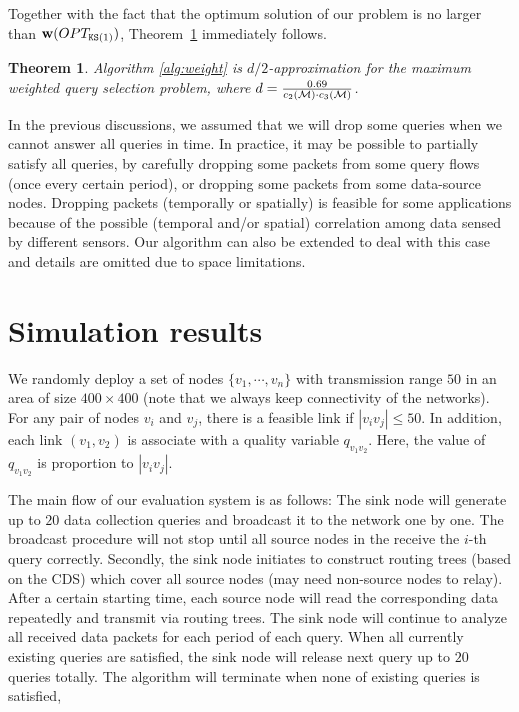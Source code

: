 \documentclass[conference,10pt]{IEEEtran}\usepackage{amsmath}
\newtheorem{boldtheorem}{\textbf{Theorem}}
\def\weight{\textbf{w}}
\begin{document}
Together with the fact that the optimum solution of our problem is
no larger than $\weight(OPT_{\knap(1)})$,
Theorem~\ref{the:weighted_appr} immediately follows.
\begin{boldtheorem}\label{the:weighted_appr}
Algorithm \ref{alg:weight} is $d/2$-approximation for the maximum
weighted query selection problem, where
 $d=\frac{0.69}{c_2({\cal M})\cdot c_3({\cal M})}$.
\end{boldtheorem}

In the previous discussions, we assumed that we will drop some
queries when we cannot answer all queries in time. In practice, it
may be
 possible to partially satisfy all queries, by carefully
 dropping some packets from some query flows (once every certain period), or
 dropping some packets from some data-source nodes.
  Dropping packets (temporally or spatially)
 is feasible for some applications because of the possible
 (temporal and/or spatial) correlation among data sensed by different
 sensors.
Our algorithm can also be extended to deal with this case and
details
 are omitted due to space limitations.



\section{Simulation results}
\label{sec:simulation}


We randomly deploy a set of nodes $\{v_1,\cdots, v_n \}$ with
transmission range $50$
 in an area of size $400 \times 400$ (note that we always keep
 connectivity of the networks).
For any pair of nodes $v_i$ and $v_j$, there is a feasible link
 if $|v_iv_j|\le 50$.
In addition, each link $(v_1,v_2)$ is associate with a quality
variable $q_{v_1v_2}$. Here, the value of $q_{v_1v_2}$
 is proportion to $|v_iv_j|$.

The main flow of our evaluation system is as follows: The sink node
will generate up to $20$ data collection
 queries and broadcast it to the network one by one.
The broadcast procedure will not stop until all source nodes in the
 receive  the $i$-th query correctly.
Secondly, the sink node initiates
 to construct
 routing trees (based on the CDS) which cover all source nodes (may need non-source nodes
   to relay).
After a certain starting time, each source node will read the corresponding data
  repeatedly and transmit via routing trees.
The sink node will continue to analyze all received data packets
 for each period of each query.
When all currently existing queries are satisfied, the sink node
 will release next query up to $20$ queries totally.
The algorithm will
terminate when none of existing queries is satisfied,
\end{document}
